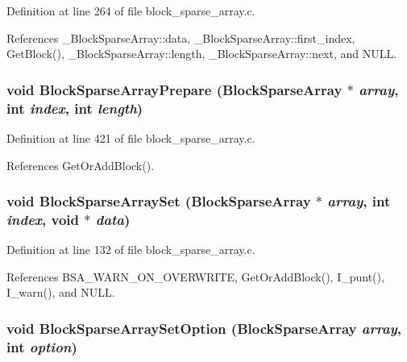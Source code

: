 Definition at line 264 of file block\_\-sparse\_\-array.c.

References \_\-Block\-Sparse\-Array::data, \_\-Block\-Sparse\-Array::first\_\-index, Get\-Block(), \_\-Block\-Sparse\-Array::length, \_\-Block\-Sparse\-Array::next, and NULL.
\subsubsection{\setlength{\rightskip}{0pt plus 5cm}void Block\-Sparse\-Array\-Prepare (\bf{Block\-Sparse\-Array} $\ast$ {\em array}, int {\em index}, int {\em length})}\label{block__sparse__array_8c_7f0e8079e206ab4caa1e80ee4418770d}




Definition at line 421 of file block\_\-sparse\_\-array.c.

References Get\-Or\-Add\-Block().
\subsubsection{\setlength{\rightskip}{0pt plus 5cm}void Block\-Sparse\-Array\-Set (\bf{Block\-Sparse\-Array} $\ast$ {\em array}, int {\em index}, void $\ast$ {\em data})}\label{block__sparse__array_8c_1cbcf4fa36138a9fd05f2517fc2fe5ea}




Definition at line 132 of file block\_\-sparse\_\-array.c.

References BSA\_\-WARN\_\-ON\_\-OVERWRITE, Get\-Or\-Add\-Block(), I\_\-punt(), I\_\-warn(), and NULL.
\subsubsection{\setlength{\rightskip}{0pt plus 5cm}void Block\-Sparse\-Array\-Set\-Option (\bf{Block\-Sparse\-Array} {\em array}, int {\em option})}\label{block__sparse__array_8c_8a80d175ad7bb329b089b3e9de62a2c7}




